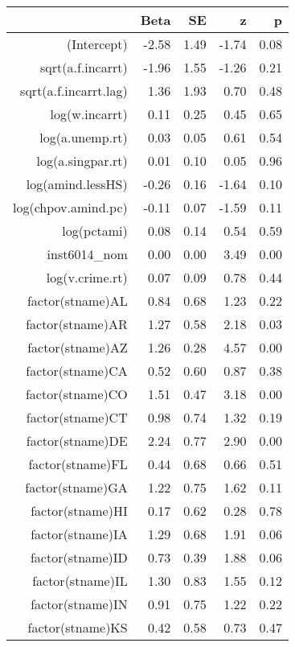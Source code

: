 \begin{table}[ht]
\centering
\begin{tabular}{rrrrr}
  \hline
 & Beta & SE & z & p \\ 
  \hline
(Intercept) & -2.58 & 1.49 & -1.74 & 0.08 \\ 
  sqrt(a.f.incarrt) & -1.96 & 1.55 & -1.26 & 0.21 \\ 
  sqrt(a.f.incarrt.lag) & 1.36 & 1.93 & 0.70 & 0.48 \\ 
  log(w.incarrt) & 0.11 & 0.25 & 0.45 & 0.65 \\ 
  log(a.unemp.rt) & 0.03 & 0.05 & 0.61 & 0.54 \\ 
  log(a.singpar.rt) & 0.01 & 0.10 & 0.05 & 0.96 \\ 
  log(amind.lessHS) & -0.26 & 0.16 & -1.64 & 0.10 \\ 
  log(chpov.amind.pc) & -0.11 & 0.07 & -1.59 & 0.11 \\ 
  log(pctami) & 0.08 & 0.14 & 0.54 & 0.59 \\ 
  inst6014\_nom & 0.00 & 0.00 & 3.49 & 0.00 \\ 
  log(v.crime.rt) & 0.07 & 0.09 & 0.78 & 0.44 \\ 
  factor(stname)AL & 0.84 & 0.68 & 1.23 & 0.22 \\ 
  factor(stname)AR & 1.27 & 0.58 & 2.18 & 0.03 \\ 
  factor(stname)AZ & 1.26 & 0.28 & 4.57 & 0.00 \\ 
  factor(stname)CA & 0.52 & 0.60 & 0.87 & 0.38 \\ 
  factor(stname)CO & 1.51 & 0.47 & 3.18 & 0.00 \\ 
  factor(stname)CT & 0.98 & 0.74 & 1.32 & 0.19 \\ 
  factor(stname)DE & 2.24 & 0.77 & 2.90 & 0.00 \\ 
  factor(stname)FL & 0.44 & 0.68 & 0.66 & 0.51 \\ 
  factor(stname)GA & 1.22 & 0.75 & 1.62 & 0.11 \\ 
  factor(stname)HI & 0.17 & 0.62 & 0.28 & 0.78 \\ 
  factor(stname)IA & 1.29 & 0.68 & 1.91 & 0.06 \\ 
  factor(stname)ID & 0.73 & 0.39 & 1.88 & 0.06 \\ 
  factor(stname)IL & 1.30 & 0.83 & 1.55 & 0.12 \\ 
  factor(stname)IN & 0.91 & 0.75 & 1.22 & 0.22 \\ 
  factor(stname)KS & 0.42 & 0.58 & 0.73 & 0.47 \\ 

\end{tabular}
\end{table}
